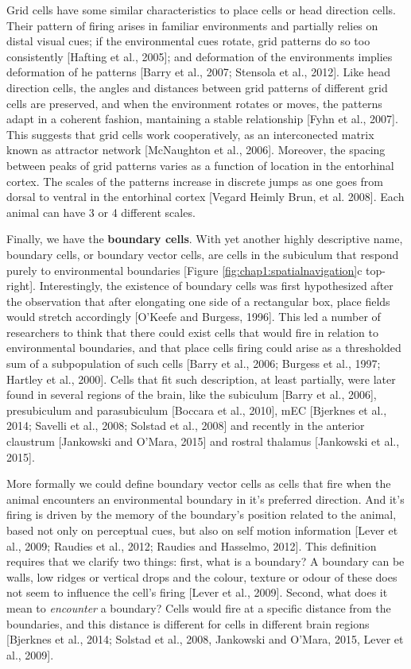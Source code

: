 Grid cells have some similar characteristics to place cells or head direction cells.
Their pattern of firing arises in familiar environments and partially relies on distal visual cues; if the environmental cues rotate, grid patterns do so too consistently [Hafting et al., 2005]; and deformation of the environments implies deformation of he patterns [Barry et al., 2007; Stensola et al., 2012].
Like head direction cells, the angles and distances between grid patterns of different grid cells are preserved, and when the environment rotates or moves, the patterns adapt in a coherent fashion, mantaining a stable relationship [Fyhn et al., 2007].
This suggests that grid cells work cooperatively, as an interconected matrix known as attractor network [McNaughton et al., 2006].
Moreover, the spacing between peaks of grid patterns varies as a function of location in the entorhinal cortex. 
The scales of the patterns increase in discrete jumps as one goes from dorsal to ventral in the entorhinal cortex [Vegard Heimly Brun, et al. 2008].
Each animal can have 3 or 4 different scales. 

Finally, we have the \textbf{boundary cells}.
With yet another highly descriptive name, boundary cells, or boundary vector cells, are cells in the subiculum that respond purely to environmental boundaries [Figure \ref{fig:chap1:spatialnavigation}c top-right].
Interestingly, the existence of boundary cells was first hypothesized after the observation that after elongating one side of a rectangular box, place fields would stretch accordingly [O’Keefe and Burgess, 1996].
This led a number of researchers to think that there could exist cells that would fire in relation to environmental boundaries, and that place cells firing could arise as a thresholded sum of a subpopulation of such cells [Barry et al., 2006; Burgess et al., 1997; Hartley et al., 2000]. 
Cells that fit such description, at least partially, were later found in several regions of the brain, like the subiculum [Barry et al., 2006], presubiculum and parasubiculum [Boccara et al., 2010], mEC [Bjerknes et al., 2014; Savelli et al., 2008; Solstad et al., 2008] and recently in the anterior claustrum [Jankowski and O’Mara, 2015] and rostral thalamus [Jankowski et al., 2015].

More formally we could define boundary vector cells as cells that fire when the animal encounters an environmental boundary in it's preferred direction.
And it's firing is driven by the memory of the boundary's position related to the animal, based not only on perceptual cues, but also on self motion information [Lever et al., 2009; Raudies et al., 2012; Raudies and Hasselmo, 2012]. 
This definition requires that we clarify two things: first, what is a boundary? A boundary can be walls, low ridges or vertical drops and the colour, texture or odour of these does not seem to influence the cell’s firing [Lever et al., 2009].
Second, what does it mean to \textit{encounter} a boundary? Cells would fire at a specific distance from the boundaries, and this distance is different for cells in different brain regions [Bjerknes et al., 2014; Solstad et al., 2008, Jankowski and O’Mara, 2015, Lever et al., 2009].

